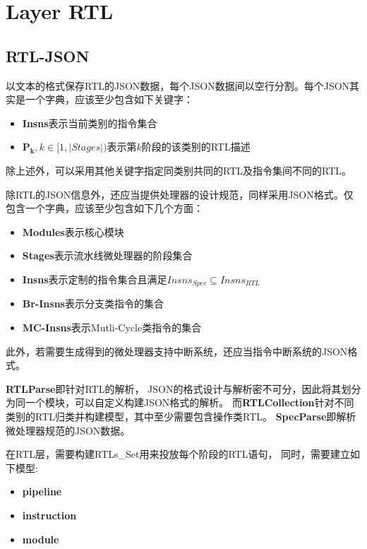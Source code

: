 \documentclass[hyperref,UTF8]{ctexart}
\theoremstyle{definition}
\theoremstyle{remark}
\numberwithin{equation}{subsection}
\newcommand{\Emph}{\textbf}
\begin{document}
	
\section{Layer RTL}
\label{sec:layer_rtl}
	
\subsection{RTL-JSON}	

	以文本的格式保存RTL的JSON数据，每个JSON数据间以空行分割。每个JSON其实是一个字典，应该至少包含如下关键字：
	\begin{itemize}
	
		\item \Emph{Insns}表示当前类别的指令集合
		
		\item $\mathbf{P_k}, k \in [1, |Stages|)$表示第$k$阶段的该类别的RTL描述
		
	\end{itemize}
	除上述外，可以采用其他关键字指定同类别共同的RTL及指令集间不同的RTL。
	
	除RTL的JSON信息外，还应当提供处理器的设计规范，同样采用JSON格式。仅包含一个字典，应该至少包含如下几个方面：
	\begin{itemize}
	
		\item \Emph{Modules}表示核心模块
		
		\item \Emph{Stages}表示流水线微处理器的阶段集合
		
		\item \Emph{Insns}表示定制的指令集合且满足$Insns_{Spec} \subseteq Insns_{RTL}$
		
		\item \Emph{Br-Insns}表示分支类指令的集合
		
		\item \Emph{MC-Insns}表示Mutli-Cycle类指令的集合
		
	\end{itemize}
	
	此外，若需要生成得到的微处理器支持中断系统，还应当指令中断系统的JSON格式。
	
	\Emph{RTLParse}即针对RTL的解析，
	JSON的格式设计与解析密不可分，因此将其划分为同一个模块，可以自定义构建JSON格式的解析。
	而\Emph{RTLCollection}针对不同类别的RTL归类并构建模型，其中至少需要包含操作类RTL。
	\Emph{SpecParse}即解析微处理器规范的JSON数据。
	
	在RTL层，需要构建RTLs\_Set用来投放每个阶段的RTL语句，
	同时，需要建立如下模型:
	\begin{itemize}
		
		\item \Emph{pipeline}
		
		\item \Emph{instruction}
		
		\item \Emph{module}
		
	\end{itemize}
	
\end{document}
